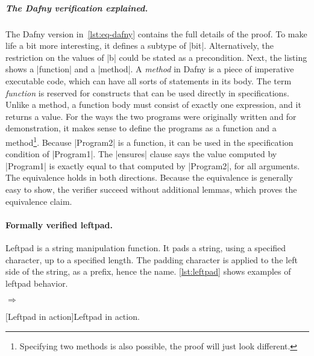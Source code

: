\subparagraph*{The Dafny verification explained.}
The Dafny version in~\autoref{lst:eq-dafny} contains the full details of the proof.
To make life a bit more interesting, it defines a subtype of \pr|bit|.
Alternatively, the restriction on the values of \pr|b| could be stated as a precondition.
Next, the listing shows a \pr|function| and a \pr|method|.
A \emph{method} in Dafny is a piece of imperative executable code, which can have all sorts of statements in its body.
The term \emph{function} is reserved for constructs that can be used directly in specifications.
Unlike a method, a function body must consist of exactly one expression, and it returns a value.
For the ways the two programs were originally written and for demonstration,
it makes sense to define the programs as a function and a method\footnote{
Specifying two methods is also possible, the proof will just look different.}.
Because \pr|Program2| is a function, it can be used in the specification condition of \pr|Program1|.
The \pr|ensures| clause says the value computed by \pr|Program1| is exactly equal to that
computed by \pr|Program2|, for all arguments.
The equivalence holds in both directions.
Because the equivalence is generally easy to show, the verifier succeed without additional lemmas,
which proves the equivalence claim.

\paragraph{Formally verified leftpad.}
Leftpad is a string manipulation function.
It pads a string, using a specified character, up to a specified length.
The padding character is applied to the left side of the string, as a prefix, hence the name.
\autoref{lst:leftpad} shows examples of leftpad behavior.

\begin{center}
\captionsetup{type=lstlisting}
\begin{minipage}{\textwidth}
\begin{minipage}{.45\textwidth}
\end{minipage}%
\hfill\(\Rightarrow\)\hfill%
\begin{minipage}{.45\textwidth}
\end{minipage}
\end{minipage}
[Leftpad in action]{Leftpad in action.}
\label{lst:leftpad}
\end{center}

